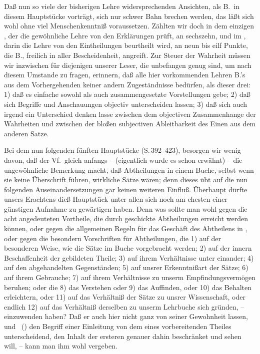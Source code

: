 Daß nun so viele der bisherigen Lehre widersprechenden Ansichten, als B.\ in diesem  Hauptstücke vorträgt, sich nur schwer Bahn brechen werden, das läßt sich wohl ohne viel Menschenkenntniß voraussetzen. Zählten wir doch in dem einzigen , der die gewöhnliche Lehre von den Erklärungen prüft, an sechszehn, und im , darin die Lehre von den Eintheilungen beurtheilt wird, an neun bis eilf Punkte, die B., freilich in aller Bescheidenheit, angreift. Zur Steuer der Wahrheit müssen wir inzwischen für diejenigen unserer Leser, die unbefangen genug sind, um nach diesem Umstande zu fragen, erinnern, daß alle hier vorkommenden Lehren B.'s aus dem Vorhergehenden keiner andern Zugeständnisse bedürfen, als dieser drei: 1) daß es einfache sowohl als auch zusammengesetzte Vorstellungen gebe; 2) daß sich Begriffe und Anschauungen objectiv unterscheiden lassen; 3) daß sich auch irgend ein Unterschied denken lasse zwischen dem objectiven Zusammenhange der Wahrheiten und zwischen der bloßen subjectiven Ableitbarkeit des Einen aus dem anderen Satze. \par 
Bei dem nun folgenden fünften Hauptstücke  (S.\,392--423), besorgen wir wenig davon, daß der Vf.\ gleich anfangs -- (eigentlich wurde es schon  erwähnt) -- die ungewöhnliche Bemerkung macht, daß Abtheilungen in einem Buche, selbst wenn sie keine Überschrift führen, wirkliche Sätze wären; denn dieses übt auf die nun folgenden Auseinandersetzungen gar keinen weiteren Einfluß. Überhaupt dürfte unsers Erachtens dieß Hauptstück unter allen sich noch am ehesten einer günstigen Aufnahme zu gewärtigen haben. Denn was sollte man wohl gegen die acht  angedeuteten Vortheile, die durch geschickte Abtheilungen erreicht werden können, oder gegen die allgemeinen Regeln für das Geschäft des Abtheilens in , oder gegen die besondern Vorschriften für Abtheilungen, die 1) auf der besonderen Weise, wie die Sätze im Buche vorgebracht werden; 2) auf der innern Beschaffenheit der gebildeten Theile; 3) auf ihrem Verhältnisse unter einander; 4) auf den abgehandelten Gegenständen; 5) auf unsrer Erkenntnißart der Sätze; 6) auf ihrem Gebrauche; 7) auf ihrem Verhältnisse zu unserm Empfindungsvermögen beruhen; oder die 8) das Verstehen oder 9) das Auffinden, oder 10) das Behalten erleichtern, oder 11) auf das Verhältniß der Sätze zu unsrer Wissenschaft, oder endlich 12) auf das Verhältniß derselben zu unserm Lehrbuche sich gründen, -- einzuwenden haben? Daß er auch hier nicht ganz von seiner Gewohnheit lassen, und \zB\ () den Begriff einer Einleitung von dem eines vorbereitenden Theiles unterscheidend, den Inhalt der ersteren genauer dahin beschränket und sehen will,  -- kann man ihm wohl vergeben. \par 
